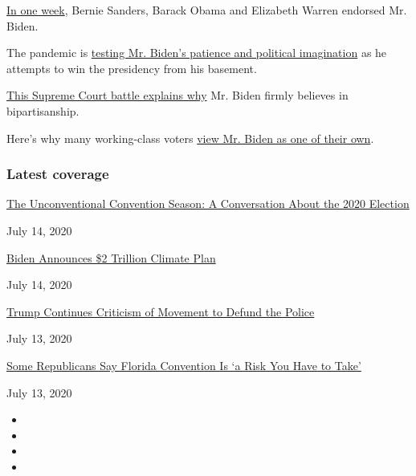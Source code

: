 \href{https://www.nytimes3xbfgragh.onion/2020/04/15/us/politics/elizabeth-warren-endorse-biden.html?action=click\&module=RelatedLinks\&pgtype=Article}{In
one week}, Bernie Sanders, Barack Obama and Elizabeth Warren endorsed
Mr. Biden.

The pandemic is
\href{https://www.nytimes3xbfgragh.onion/2020/04/25/us/politics/joe-biden-coronavirus-quarantine.html}{testing
Mr. Biden's patience and political imagination} as he attempts to win
the presidency from his basement.

\href{https://www.nytimes3xbfgragh.onion/2019/09/07/us/politics/joe-biden-bork-supreme-court.html}{This
Supreme Court battle explains why} Mr. Biden firmly believes in
bipartisanship.

Here's why many working-class voters
\href{https://www.nytimes3xbfgragh.onion/2019/11/19/us/politics/joe-biden-working-class.html}{view
Mr. Biden as one of their own}.

\hypertarget{latest-coverage}{%
\subsubsection{Latest coverage}\label{latest-coverage}}

\href{https://www.nytimes3xbfgragh.onion/2020/07/14/us/politics/2020-political-conventions.html}{The
Unconventional Convention Season: A Conversation About the 2020
Election}

July 14, 2020

\href{https://www.nytimes3xbfgragh.onion/2020/07/14/us/politics/biden-climate-plan.html}{Biden
Announces \$2 Trillion Climate Plan}

July 14, 2020

\href{https://www.nytimes3xbfgragh.onion/2020/07/13/us/politics/trump-police-reform.html}{Trump
Continues Criticism of Movement to Defund the Police}

July 13, 2020

\href{https://www.nytimes3xbfgragh.onion/2020/07/13/us/elections/biden-vs-trump.html}{Some
Republicans Say Florida Convention Is `a Risk You Have to Take'}

July 13, 2020

\begin{itemize}
\item
\item
\item
\item
\end{itemize}


